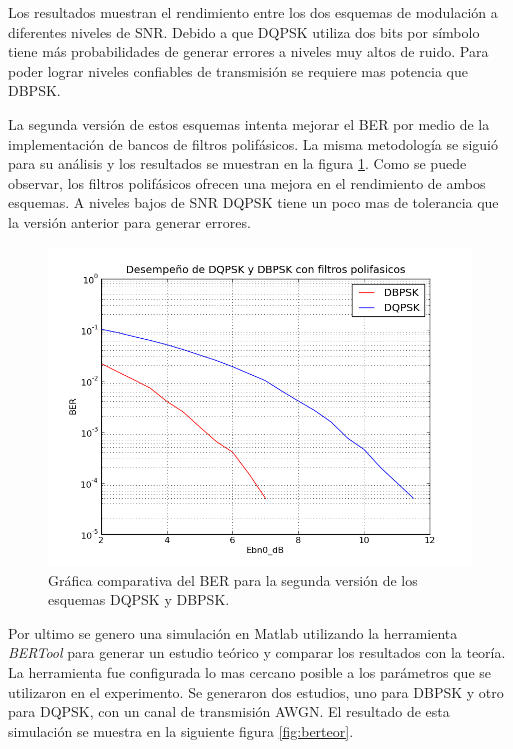 Los resultados muestran el rendimiento entre los dos esquemas de modulaci\'on a diferentes niveles
de SNR. Debido a que DQPSK utiliza dos bits por s\'imbolo tiene m\'as probabilidades de generar
errores a niveles muy altos de ruido. Para poder lograr niveles confiables de transmisi\'on se
requiere mas potencia que DBPSK.

La segunda versi\'on de estos esquemas intenta mejorar el BER por medio de la implementaci\'on de
bancos de filtros polif\'asicos. La misma metodolog\'ia se sigui\'o para su an\'alisis y los
resultados se muestran en la figura \ref{fig:berpoly}. Como se puede observar, los filtros
polif\'asicos ofrecen una mejora en el rendimiento de ambos esquemas. A niveles bajos de SNR DQPSK
tiene un poco mas de tolerancia que la versi\'on anterior para generar errores. 

\begin{figure}[t]
  \centering
  \includegraphics[scale=0.7]{figs/berpoly}
  \caption{Gr\'afica comparativa del BER para la segunda versi\'on de los esquemas DQPSK y DBPSK.}
  \label{fig:berpoly}
\end{figure}

Por ultimo se genero una simulaci\'on en Matlab utilizando la herramienta \emph{BERTool} para generar un estudio te\'orico y
comparar los resultados con la teor\'ia. La herramienta fue configurada lo mas cercano posible a los par\'ametros que se
utilizaron en el experimento. Se generaron dos estudios, uno para DBPSK y otro para DQPSK, con un canal de transmisi\'on AWGN. El
resultado de esta simulaci\'on se muestra en la siguiente figura \ref{fig:berteor}.

